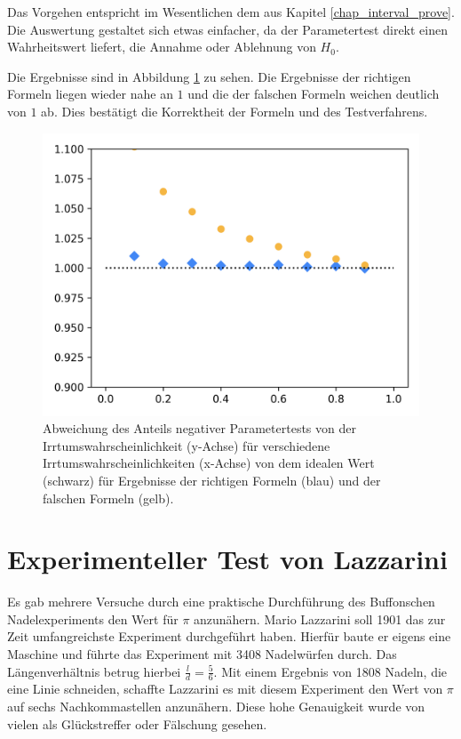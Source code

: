 \documentclass[10pt,twocolumn]{scrartcl}
\begin{document}
		Das Vorgehen entspricht im Wesentlichen dem aus Kapitel \ref{chap_interval_prove}. Die Auswertung gestaltet sich etwas einfacher, da der Parametertest direkt einen Wahrheitswert liefert, die Annahme oder Ablehnung von $H_0$.

		Die Ergebnisse sind in Abbildung \ref{fig_test_mean_dot} zu sehen. Die Ergebnisse der richtigen Formeln liegen wieder nahe an $1$ und die der falschen Formeln weichen deutlich von $1$ ab. Dies bestätigt die Korrektheit der Formeln und des Testverfahrens.

		\begin{figure}[H]
			\centering
			\includegraphics[width=0.9\columnwidth]{images/mean_test.png}
			\caption{Abweichung des Anteils negativer Parametertests von der Irrtumswahrscheinlichkeit (y-Achse) für verschiedene Irrtumswahrscheinlichkeiten (x-Achse) von dem idealen Wert (schwarz) für Ergebnisse der richtigen Formeln (blau) und der falschen Formeln (gelb).}
			\label{fig_test_mean_dot}
		\end{figure}

\section{Experimenteller Test von Lazzarini}
	Es gab mehrere Versuche durch eine praktische Durchführung des Buffonschen Nadelexperiments den Wert für $\pi$ anzunähern. Mario Lazzarini soll 1901 das zur Zeit umfangreichste Experiment durchgeführt haben. Hierfür baute er eigens eine Maschine und führte das Experiment mit 3408 Nadelwürfen durch. Das Längenverhältnis betrug hierbei ${\tfrac {l}{d}={\tfrac {5}{6}}}$. Mit einem Ergebnis von 1808 Nadeln, die eine Linie schneiden, schaffte Lazzarini es mit diesem Experiment den Wert von $\pi$ auf sechs Nachkommastellen anzunähern. Diese hohe Genauigkeit wurde von vielen als Glückstreffer oder Fälschung gesehen.\cite{Badger}
\end{document}
